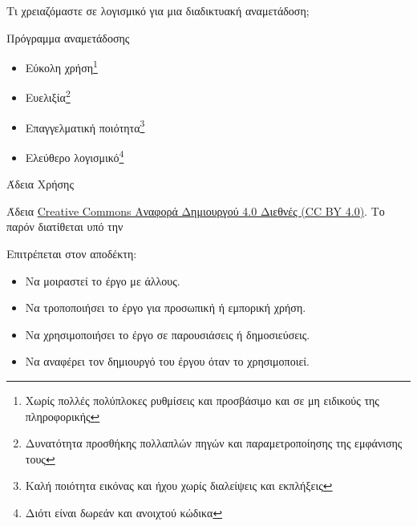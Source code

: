 \documentclass[aspectratio=169]{beamer}
\begin{document}
\begin{frame}{Τι χρειαζόμαστε σε λογισμικό για μια διαδικτυακή αναμετάδοση;}
  \begin{block}{Πρόγραμμα αναμετάδοσης}
    \begin{itemize}
      \item Εύκολη χρήση\footnote{Χωρίς πολλές πολύπλοκες ρυθμίσεις και προσβάσιμο και σε μη ειδικούς της πληροφορικής}
      \item Ευελιξία\footnote{Δυνατότητα προσθήκης πολλαπλών πηγών και παραμετροποίησης της εμφάνισης τους}
      \item Επαγγελματική ποιότητα\footnote{Καλή ποιότητα εικόνας και ήχου χωρίς διαλείψεις και εκπλήξεις}
      \item Ελεύθερο λογισμικό\footnote{Διότι είναι δωρεάν και ανοιχτού κώδικα}
    \end{itemize}
  \end{block}
\end{frame}

\begin{frame}{Άδεια Χρήσης}
  \begin{center}
    \ccbysa
  \end{center}
  \begin{center}
    Άδεια \href{https://creativecommons.org/licenses/by/4.0/}{Creative Commons Αναφορά Δημιουργού 4.0 Διεθνές (CC BY 4.0)}.  Το παρόν διατίθεται υπό την
    \ccbysa
  \end{center}
  \begin{exampleblock}{Επιτρέπεται στον αποδέκτη:}
    \begin{itemize}
      \item Να μοιραστεί το έργο με άλλους.
      \item Να τροποποιήσει το έργο για προσωπική ή εμπορική χρήση.
      \item Να χρησιμοποιήσει το έργο σε παρουσιάσεις ή δημοσιεύσεις.
      \item Να αναφέρει τον δημιουργό του έργου όταν το χρησιμοποιεί.

    \end{itemize}
  \end{exampleblock}
\end{frame}
\end{document}
